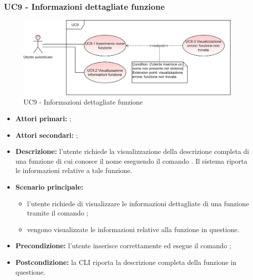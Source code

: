 \subsubsection{UC9 - Informazioni dettagliate funzione}
\begin{figure}[h]
	\centering
	\includegraphics[scale=\ucs]{./res/img/UC9.png}
	\caption {UC9 - Informazioni dettagliate funzione}
\end{figure}
\begin{itemize}
	\item \textbf{Attori primari:} \ua{};
	\item \textbf{Attori secondari:} \re{};
	\item \textbf{Descrizione:} l’utente richiede la visualizzazione della descrizione completa di una funzione di cui conosce il nome eseguendo il comando \pinfo{}. Il sistema riporta le informazioni relative a tale funzione.
	\item \textbf{Scenario principale:} 
	\begin{itemize}
		\item l'utente richiede di visualizzare le informazioni dettagliate di una funzione tramite il comando \pinfo{}; 
		\item vengono visualizzate le informazioni relative alla funzione in questione.
	\end{itemize}
	\item \textbf{Precondizione:} l'utente inserisce correttamente ed esegue il comando \pinfo{};
	\item \textbf{Postcondizione:} la CLI riporta la descrizione completa della funzione in questione.
\end{itemize}